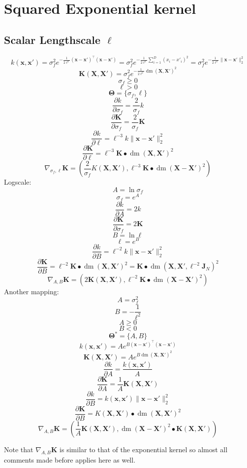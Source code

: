 \documentclass[a4paper,11pt]{article}
\newcommand\x{{\mathbf x}}
\newcommand\X{{\mathbf X}}
\newcommand\K{{\mathbf K}}
\newcommand\J{{\mathbf J}}
\DeclareMathOperator*{\dm}{dm}
\begin{document}
\section{Squared Exponential kernel}

\subsection{Scalar Lengthscale $\ell$}
$$k(\x,\x') = \sigma_f^2 e^{-\frac{1}{2\ell^2} (\x-\x')^{\top}(\x-\x')}
  = \sigma_f^2 e^{-\frac{1}{2\ell^2} \sum_{i=1}^D (x_i - x'_i)^2} =
  \sigma_f^2 e^{-\frac{1}{2\ell^2} \|\x-\x'\|_2^2}$$ 
$$\K(\X,\X') = \sigma_f^2 e^{-\frac{1}{2\ell^2} \dm(\X,\X')^2}$$
$$\sigma_f \ge 0$$
$$\ell > 0$$
$$\mathbf{\Theta} = \{ \sigma_f, \ell \}$$
$$\frac{\partial k}{\partial \sigma_f} = \frac{2}{\sigma_f}k$$
$$\frac{\partial \K}{\partial \sigma_f} = \frac{2}{\sigma_f}\K$$
$$\frac{\partial k}{\partial \ell} = \ell^{-3} k \|\x-\x'\|_2^2 $$
$$\frac{\partial \K}{\partial \ell} = \ell^{-3} \K \bullet \dm(\X,\X')^2$$
$$\nabla_{\sigma_f,\ell} \K = \left(\frac{2}{\sigma_f}K(\X,\X'), \ell^{-3} \K \bullet \dm(\X-\X')^2 \right)$$
Logscale:
$$A = \ln{\sigma_f}$$
$$\sigma_f = e^A$$
$$\frac{\partial k}{\partial A} = 2k$$
$$\frac{\partial \K}{\partial \sigma_f} = 2\K$$
$$B = \ln{\ell}$$
$$\ell = e^B$$
$$\frac{\partial k}{\partial B} = \ell^{-2} k \|\x-\x'\|_2^2$$
$$\frac{\partial \K}{\partial B} = \ell^{-2} \K \bullet \dm(\X,\X')^2 = \K \bullet \dm(\X,\X',\ell^{-2}\J_N)^2$$
$$\nabla_{A,B} \K = \left( 2\K(\X,\X'), \ell^{-2} \K \bullet \dm(\X-\X')^2 \right)$$
Another mapping:
$$A = \sigma_f^2$$
$$B = -\frac{1}{\ell^2}$$
$$A \ge 0$$
$$B < 0$$
$$\mathbf{\Theta}^* = \{ A, B\}$$
$$k(\x,\x') = A e^{B (\x-\x')^{\top}(\x-\x')}$$
$$\K(\X,\X') = A e^{B \dm(\X,\X')^2}$$
$$\frac{\partial k}{\partial A} = \frac{k(\x,\x')}{A}$$
$$\frac{\partial \K}{\partial A} = \frac{1}{A}\K(\X,\X')$$
$$\frac{\partial k}{\partial B} = k(\x,\x') \|\x-\x'\|_2^2$$
$$\frac{\partial \K}{\partial B} = K(\X,\X') \bullet \dm(\X,\X')^2$$
$$\nabla_{A,B} \K = (\frac{1}{A} \K(\X,\X'), \dm(\X-\X')^2 \bullet
\K(\X,\X'))$$

Note that $\nabla_{A,B} \K$ is similar to that of the exponential
kernel so almost all comments made before applies here as well.
\end{document}

